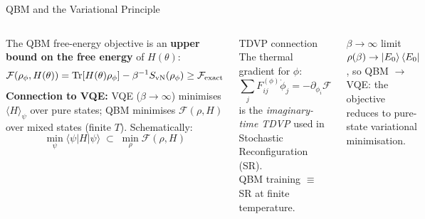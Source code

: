 \documentclass[aspectratio=169,10pt]{beamer}
\begin{document}
\begin{frame}{QBM and the Variational Principle}
  \begin{columns}[T]
      The QBM free-energy objective is an
      \textbf{upper bound on the free energy} of $H(\theta)$:
      \[
        \mathcal{F}(\rho_\phi,H(\theta))
        = \Tr[H(\theta)\rho_\phi]
          - \beta^{-1}S_{\rm vN}(\rho_\phi)
        \ge \mathcal{F}_{\rm exact}
      \]
      \textbf{Connection to VQE:}
      VQE ($\beta\to\infty$) minimises $\langle H\rangle_\psi$
      over pure states; QBM minimises $\mathcal{F}(\rho,H)$ over
      mixed states (finite $T$). Schematically:
      \[
        \min_\psi\langle\psi|H|\psi\rangle
        \;\subset\;
        \min_\rho\mathcal{F}(\rho,H)
      \]
      \begin{block}{TDVP connection}
        The thermal gradient for $\phi$:
        \[
          \sum_j F_{ij}^{(\phi)}\dot\phi_j
          = -\partial_{\phi_i}\mathcal{F}
        \]
        is the \emph{imaginary-time TDVP} used in
        Stochastic Reconfiguration (SR).\\[2pt]
        QBM training $\equiv$ SR at finite temperature.
      \end{block}
      \vspace{0.1cm}
      \begin{alertblock}{$\beta\to\infty$ limit}
        $\rho(\beta)\to\ket{E_0}\bra{E_0}$, so
        QBM $\to$ VQE: the objective reduces to
        pure-state variational minimisation.
      \end{alertblock}
  \end{columns}
\end{frame}
\end{document}
